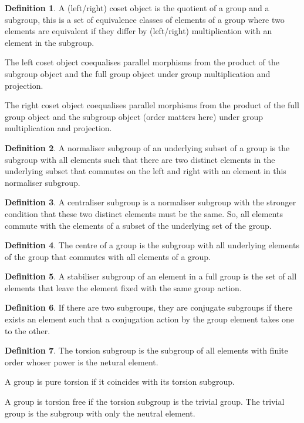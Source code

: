 \documentclass[10pt]{article}
\theoremstyle{plain}%
\theoremstyle{definition}
\newtheorem{definition}{Definition}[section]
\theoremstyle{remark}
\begin{document}
\begin{definition}
	A (left/right) coset object is the quotient of a group and a subgroup, this is a set of equivalence classes of elements of a group where two elements are equivalent if they differ by (left/right) multiplication with an element in the subgroup.

	The left coset object coequalises parallel morphisms from the product of the subgroup object and the full group object under group multiplication and projection.

	The right coset object coequalises parallel morphisms from the product of the full group object and the subgroup object (order matters here) under group multiplication and projection.
\end{definition}

\begin{definition}
	A normaliser subgroup of an underlying subset of a group is the subgroup with all elements such that there are two distinct elements in the underlying subset that commutes on the left and right with an element in this normaliser subgroup.
\end{definition}

\begin{definition}
	A centraliser subgroup is a normaliser subgroup with the stronger condition that these two distinct elements must be the same. So, all elements commute with the elements of a subset of the underlying set of the group.
\end{definition}

\begin{definition}
	The centre of a group is the subgroup with all underlying elements of the group that commutes with all elements of a group.
\end{definition}

\begin{definition}
	A stabiliser subgroup of an element in a full group is the set of all elements that leave the element fixed with the same group action. 
\end{definition}

\begin{definition}
	If there are two subgroups, they are conjugate subgroups if there exists an element such that a conjugation action by the group element takes one to the other.
\end{definition}

\begin{definition}
	The torsion subgroup is the subgroup of all elements with finite order whoser power is the netural element.

	A group is pure torsion if it coincides with its torsion subgroup.

	A group is torsion free if the torsion subgroup is the trivial group. The trivial group is the subgroup with only the neutral element.
\end{definition}
\end{document}
